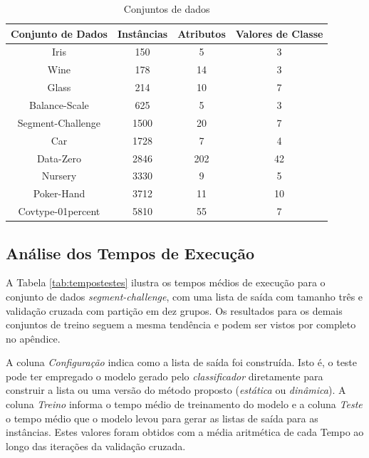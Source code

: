 \begin{table}[h!]
  \begin{center}
    \begin{tabular}{cccc}
      \hline
      \textbf{Conjunto de Dados} & \textbf{Instâncias} & \textbf{Atributos} & \textbf{Valores de Classe} \\
      \hline

      Iris & 150 & 5 & 3 \\
      Wine & 178 & 14 & 3 \\ 
      Glass & 214 & 10 & 7 \\
      Balance-Scale & 625 & 5 & 3 \\
      Segment-Challenge & 1500 & 20 & 7 \\
      Car & 1728 & 7 & 4 \\
      Data-Zero & 2846 & 202 & 42 \\
      Nursery & 3330 & 9 & 5 \\
      Poker-Hand & 3712 & 11 & 10 \\      
      Covtype-01percent & 5810 & 55 & 7 \\

      \hline
    \end{tabular}
    \caption{Conjuntos de dados}
    \label{tab:datasets}
  \end{center}
\end{table}

\subsection{Análise dos Tempos de Execução}

A Tabela \ref{tab:tempostestes} ilustra os tempos médios de execução para o conjunto de dados \textit{segment-challenge}, com uma lista de saída com tamanho três e validação cruzada com partição em dez grupos.
Os resultados para os demais conjuntos de treino seguem a mesma tendência e podem ser vistos por completo no apêndice.

A coluna \textit{Configuração} indica como a lista de saída foi construída.
Isto é, o teste pode ter empregado o modelo gerado pelo \textit{classificador} diretamente para construir a lista ou uma versão do método proposto (\textit{estática} ou \textit{dinâmica}).
A coluna \textit{Treino} informa o tempo médio de treinamento do modelo e a coluna \textit{Teste} o tempo médio que o modelo levou para gerar as listas de saída para as instâncias.
Estes valores foram obtidos com a média aritmética de cada Tempo ao longo das iterações da validação cruzada.

